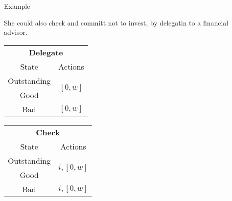 \documentclass[usenames,dvipsnames,aspectratio=169,11pt, envcountsect]{beamer}
\begin{document}
\begin{frame}[noframenumbering]{Example}

	She could also check and committ not to invest, by delegatin to a financial advisor.

	\vfill

	\begin{table}[H]
		\centering
		\begin{minipage}{0.29\textwidth}
			\centering
			\begin{tabular}{c | c}
				\multicolumn{2}{c}{\textbf{Delegate}}                                                                          \\
				State                             & Actions                                                                    \\
				\hline
				{\color{bleudefrance}Outstanding} & \multirow{2}{*}{{\color{bleudefrance}\( \left[0, \overline{w} \right] \)}} \\
				{\color{bleudefrance}Good}        &                                                                            \\
				Bad                               & \( \left[0, w \right]\)                                                    \\
			\end{tabular}
			\vspace{0.5cm} %
		\end{minipage}\hspace{0.5cm} %
		\begin{minipage}{0.29\textwidth}
			\centering
			\begin{tabular}{c | c}
				\multicolumn{2}{c}{\textbf{Check}}                                                                                 \\
				State                             & Actions                                                                        \\
				\hline
				{\color{bleudefrance}Outstanding} & \multirow{2}{*}{{\color{bleudefrance}\( i, \left[ 0, \overline{w} \right] \)}} \\
				{\color{bleudefrance}Good}        &                                                                                \\
				Bad                               & \(  i, \left[0, w \right] \)                                                   \\

\end{tabular}
\end{minipage}
\end{table}
\end{frame}
\end{document}
